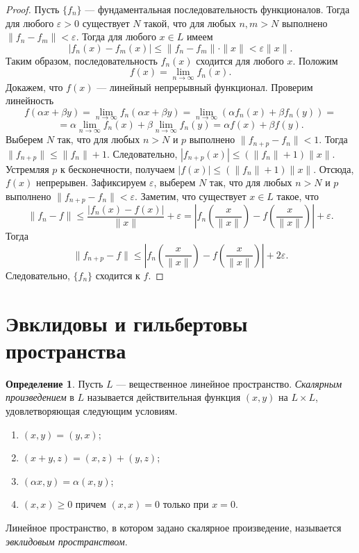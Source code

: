 \documentclass[12pt, titlepage, oneside]{amsbook}
\theoremstyle{definition}
\newtheorem{definition}[theorem]{Определение}
\theoremstyle{remark}
\begin{document}
\begin{proof}
	Пусть $\{f_n\}$ --- фундаментальная последовательность функционалов. Тогда для любого $\varepsilon>0$ существует $N$ такой, что для любых $n,m>N$ выполнено $\|f_n-f_m\|<\varepsilon$. Тогда для любого $x\in L$ имеем $$|f_n(x)-f_m(x)|\leq\|f_n-f_m\|\cdot\|x\|<\varepsilon \|x\|.$$ Таким образом, последовательность $f_n(x)$ сходится для любого $x$. Положим $$f(x)=\lim\limits_{n\rightarrow\infty} f_n(x).$$ Докажем, что $f(x)$ --- линейный непрерывный функционал. Проверим линейность $$f(\alpha x+\beta y)=\lim\limits_{n\rightarrow\infty} f_n(\alpha x+\beta y)=\lim\limits_{n\rightarrow\infty} (\alpha f_n(x)+\beta f_n(y))=$$ $$=\alpha\lim\limits_{n\rightarrow\infty} f_n(x)+\beta\lim\limits_{n\rightarrow\infty} f_n(y)=\alpha f(x)+\beta f(y).$$ Выберем $N$ так, что для любых $n>N$ и $p$ выполнено $\|f_{n+p}-f_n\|<1$. Тогда $\|f_{n+p}\|\leq\|f_n\|+1.$ Следовательно, $|f_{n+p}(x)|\leq(\|f_n\|+1)\|x\|.$ Устремляя $p$ к бесконечности, получаем $|f(x)|\leq(\|f_n\|+1)\|x\|$. Отсюда, $f(x)$ непрерывен. Зафиксируем $\varepsilon$, выберем $N$ так, что для любых $n>N$ и $p$ выполнено $\|f_{n+p}-f_n\|<\varepsilon$. Заметим, что существует $x\in L$ такое, что $$\|f_n-f\|\leq\frac{|f_n(x)-f(x)|}{\|x\|}+\varepsilon=\left|f_n\left(\frac{x}{\|x\|}\right)-f\left(\frac{x}{\|x\|}\right)\right|+\varepsilon.$$ Тогда $$\|f_{n+p}-f\|\leq\left|f_n\left(\frac{x}{\|x\|}\right)-f\left(\frac{x}{\|x\|}\right)\right|+2\varepsilon.$$ Следовательно, $\{f_n\}$ сходится к $f$.
\end{proof}

\section{Эвклидовы и гильбертовы пространства}


\begin{definition}
	Пусть $L$ --- вещественное линейное пространство. \emph{Скалярным произведением} в $L$ называется действительная функция $(x,y)$ на $L\times L$, удовлетворяющая следующим условиям.
	\begin{enumerate}
		\item $(x,y)=(y,x)$;
		\item $(x+y,z)=(x,z)+(y,z)$;
		\item $(\alpha x,y)=\alpha (x,y)$;
		\item $(x,x)\geq 0$ причем $(x,x)=0$ только при $x=0$.
	\end{enumerate}
	Линейное пространство, в котором задано скалярное произведение, называется \emph{эвклидовым пространством}.
\end{definition}
\end{document}
